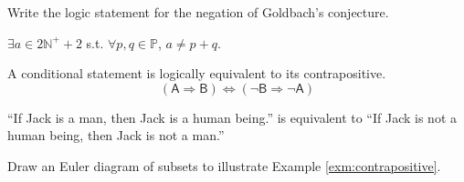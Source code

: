 \begin{exc}
  Write the logic statement
   for the negation of Goldbach's conjecture.
\end{exc}
\begin{solution}
  $\exists a\in 2\mathbb{N}^++2$ s.t. $\forall p,q \in \mathbb{P}$, 
   $a\ne p+q$.
\end{solution}



\begin{axm}[Contraposition]
  \label{axm:contrapositive}
  A conditional statement is logically equivalent to its
  contrapositive.
  \begin{equation}
    \label{eq:contraposition}
    (\mathsf{A}\Rightarrow \mathsf{B}) \Leftrightarrow
    (\neg \mathsf{B}\Rightarrow \neg \mathsf{A})
  \end{equation}
\end{axm}

\begin{exm}
  \label{exm:contrapositive}
  ``If Jack is a man, then Jack is a human being.''
  is equivalent to ``If Jack is not a human being,
  then Jack is not a man.''
\end{exm}

\begin{exc}
  Draw an Euler diagram of subsets to illustrate Example \ref{exm:contrapositive}.
\end{exc}

